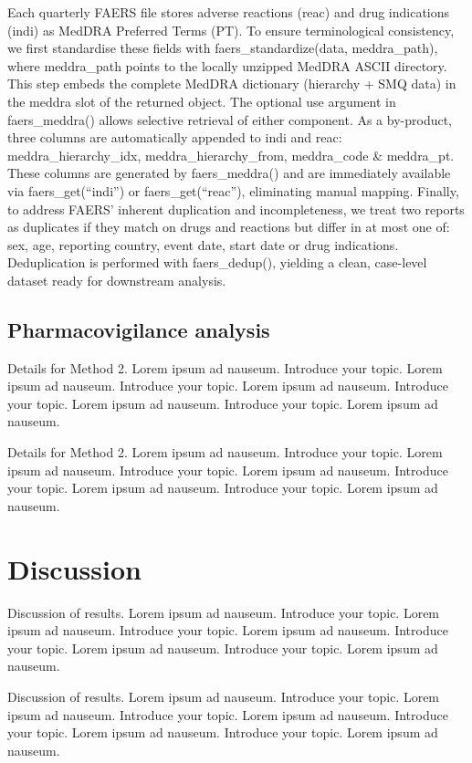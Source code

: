 \documentclass{bioinfo}
\begin{document}
Each quarterly FAERS file stores adverse reactions (reac) and drug
indications (indi) as MedDRA Preferred Terms (PT). To ensure
terminological consistency, we first standardise these fields with
faers\_standardize(data, meddra\_path), where meddra\_path points to the
locally unzipped MedDRA ASCII directory. This step embeds the complete
MedDRA dictionary (hierarchy + SMQ data) in the meddra slot of the
returned object. The optional use argument in faers\_meddra() allows
selective retrieval of either component. As a by-product, three columns
are automatically appended to indi and reac: meddra\_hierarchy\_idx,
meddra\_hierarchy\_from, meddra\_code \& meddra\_pt. These columns are
generated by faers\_meddra() and are immediately available via
faers\_get(``indi'') or faers\_get(``reac''), eliminating manual
mapping. Finally, to address FAERS' inherent duplication and
incompleteness, we treat two reports as duplicates if they match on
drugs and reactions but differ in at most one of: sex, age, reporting
country, event date, start date or drug indications. Deduplication is
performed with faers\_dedup(), yielding a clean, case-level dataset
ready for downstream analysis.

\subsection{Pharmacovigilance analysis}

Details for Method 2. Lorem ipsum ad nauseum. Introduce your topic.
Lorem ipsum ad nauseum. Introduce your topic. Lorem ipsum ad nauseum.
Introduce your topic. Lorem ipsum ad nauseum. Introduce your topic.
Lorem ipsum ad nauseum.

Details for Method 2. Lorem ipsum ad nauseum. Introduce your topic.
Lorem ipsum ad nauseum. Introduce your topic. Lorem ipsum ad nauseum.
Introduce your topic. Lorem ipsum ad nauseum. Introduce your topic.
Lorem ipsum ad nauseum.

\section{Discussion}

Discussion of results. Lorem ipsum ad nauseum. Introduce your topic.
Lorem ipsum ad nauseum. Introduce your topic. Lorem ipsum ad nauseum.
Introduce your topic. Lorem ipsum ad nauseum. Introduce your topic.
Lorem ipsum ad nauseum.

Discussion of results. Lorem ipsum ad nauseum. Introduce your topic.
Lorem ipsum ad nauseum. Introduce your topic. Lorem ipsum ad nauseum.
Introduce your topic. Lorem ipsum ad nauseum. Introduce your topic.
Lorem ipsum ad nauseum.
\end{document}
